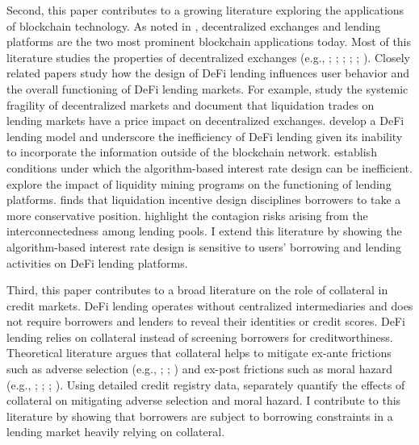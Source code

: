 \documentclass[12pt]{article}
\begin{document}
Second, this paper contributes to a growing literature exploring the applications of blockchain technology. As noted in \cite{irresberger2021public}, decentralized exchanges and lending platforms are the two most prominent blockchain applications today. Most of this literature studies the properties of decentralized exchanges (e.g., \citealp{angeris2020improved}; \citealp{aoyagi2020liquidity}; \citealp{lehar2021decentralized}; \citealp{angeris2021analysis}; \citealp{park2021conceptual}; \citealp{hasbrouck2022need}). Closely related papers study how the design of DeFi lending influences user behavior and the overall functioning of DeFi lending markets. For example, \cite{lehar2022systemic} study the systemic fragility of decentralized markets and document that liquidation trades on lending markets have a price impact on decentralized exchanges. \cite{rivera2023equilibrium} develop a DeFi lending model and underscore the inefficiency of DeFi lending given its inability to incorporate the information outside of the blockchain network. \cite{carre2023security} establish conditions under which the algorithm-based interest rate design can be inefficient. \cite{park2023phantom} explore the impact of liquidity mining programs on the functioning of lending platforms. \cite{mueller2023defi} finds that liquidation incentive design disciplines borrowers to take a more conservative position. \cite{tovanich2023contagion} highlight the contagion risks arising from the interconnectedness among lending pools. I extend this literature by showing the algorithm-based interest rate design is sensitive to users' borrowing and lending activities on DeFi lending platforms. 


Third, this paper contributes to a broad literature on the role of collateral in credit markets. DeFi lending operates without centralized intermediaries and does not require borrowers and lenders to reveal their identities or credit scores. DeFi lending relies on collateral instead of screening borrowers for creditworthiness. Theoretical literature argues that collateral helps to mitigate ex-ante frictions such as adverse selection (e.g., \citealp{bester1985screening}; \citealp{besanko1987collateral}; \citealp{besanko1987competitive}) and ex-post frictions such as moral hazard (e.g., \citealp{barro1976loan}; \citealp{igawa1990asymmetric}; \citealp{boot1991secured}; \citealp{boot1994moral}). Using detailed credit registry data, \cite{ioannidou2022collateral} separately quantify the effects of collateral on mitigating adverse selection and moral hazard. I contribute to this literature by showing that borrowers are subject to borrowing constraints in a lending market heavily relying on collateral.
\end{document}
